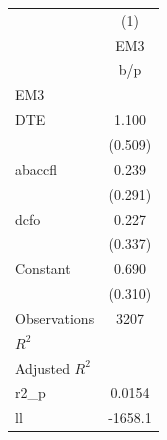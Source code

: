 {
\def\sym#1{\ifmmode^{#1}\else\(^{#1}\)\fi}
\begin{tabular}{l*{1}{c}}
\hline\hline
                    &\multicolumn{1}{c}{(1)}\\
                    &\multicolumn{1}{c}{EM3}\\
                    &         b/p   \\
\hline
EM3                 &               \\
DTE                 &       1.100   \\
                    &     (0.509)   \\
abaccfl             &       0.239   \\
                    &     (0.291)   \\
dcfo                &       0.227   \\
                    &     (0.337)   \\
Constant            &       0.690   \\
                    &     (0.310)   \\
\hline
Observations        &        3207   \\
\(R^{2}\)           &               \\
Adjusted \(R^{2}\)  &               \\
r2\_p                &      0.0154   \\
ll                  &     -1658.1   \\
\hline\hline
\end{tabular}
}
